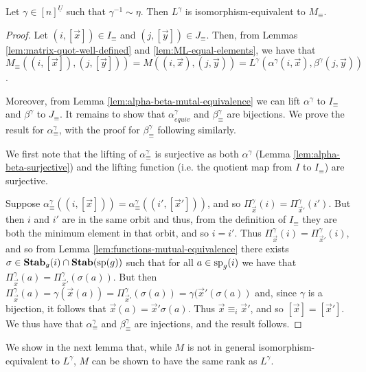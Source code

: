 \documentclass[../paper.tex]{subfiles}
\begin{document}
\begin{thm}
	Let $\gamma \in [n]^{\underline{U}}$ such that $\gamma^{-1} \sim \eta$. Then
	$L^{\gamma}$ is isomorphism-equivalent to $M_{\equiv}$.
	\label{thm:LM-equivalence}
\end{thm}
\begin{proof}
	Let $(i, [\vec{x}]) \in I_\equiv$ and $(j, [\vec{y}]) \in J_\equiv$. Then,
	from Lemmas \ref{lem:matrix-quot-well-defined} and
	\ref{lem:ML-equal-elements}, we have that $M_\equiv ((i, [\vec{x}]), (j,
	[\vec{y}])) = M ((i, \vec{x}), (j, \vec{y})) = L^{\gamma}(\alpha^{\gamma}(i,
	\vec{x}), \beta^{\gamma}(j, \vec{y}))$.
		
	Moreover, from Lemma \ref{lem:alpha-beta-mutal-equivalence} we can lift
	$\alpha^\gamma$ to $I_\equiv$ and $\beta^{\gamma}$ to $J_\equiv$. It remains
	to show that $\alpha^\gamma_{equiv}$ and $\beta^{\gamma}_{\equiv}$ are
	bijections. We prove the result for $\alpha^{\gamma}_{\equiv}$, with the proof
	for $\beta^\gamma_\equiv$ following similarly.
		
	We first note that the lifting of $\alpha^{\gamma}_{\equiv}$ is surjective as
	both $\alpha^{\gamma}$ (Lemma \ref{lem:alpha-beta-surjective}) and the lifting
	function (i.e. the quotient map from $I$ to $I_\equiv$) are surjective.
		
	Suppose $\alpha^{\gamma}_\equiv((i, [\vec{x}])) = \alpha^{\gamma}_\equiv((i',
	[\vec{x}']))$, and so $\Pi^{\gamma}_{\vec{x}}(i) =
	\Pi^{\gamma}_{\vec{x}'}(i')$. But then $i$ and $i'$ are in the same orbit and
	thus, from the definition of $I_{\equiv}$ they are both the minimum element in
	that orbit, and so $i = i'$. Thus $\Pi^{\gamma}_{\vec{x}}(i) =
	\Pi^{\gamma}_{\vec{x}'}(i)$, and so from Lemma
	\ref{lem:functions-mutual-equivalence} there exists $\sigma \in \text{\textbf{Stab}}_g(i)
	\cap \text{\textbf{Stab}} (\text{sp} (g))$ such that for all $a \in \text{sp}_g(i)$ we have that
	$\Pi^{\gamma}_{\vec{x}}(a) = \Pi^{\gamma}_{\vec{x}'} (\sigma (a))$. But then
	$\Pi^{\gamma}_{\vec{x}}(a) = \gamma (\vec{x}(a)) =
	\Pi^{\gamma}_{\vec{x}'}(\sigma (a)) = \gamma (\vec{x}' (\sigma (a))$ and,
	since $\gamma$ is a bijection, it follows that $\vec{x}(a) = \vec{x}' \sigma
	(a)$. Thus $\vec{x} \equiv_i \vec{x}'$, and so $[\vec{x}] = [\vec{x}']$. We
	thus have that $\alpha^{\gamma}_\equiv$ and $\beta^{\gamma}_\equiv$ are
	injections, and the result follows.
\end{proof}

We show in the next lemma that, while $M$ is not in general
isomorphism-equivalent to $L^\gamma$, $M$ can be shown to have the same rank as
$L^{\gamma}$.
\end{document}
